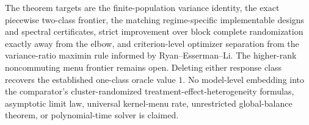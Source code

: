 The theorem targets are the finite-population variance identity, the exact piecewise two-class frontier, the matching regime-specific implementable designs and spectral certificates, strict improvement over block complete randomization exactly away from the elbow, and criterion-level optimizer separation from the variance-ratio maximin rule informed by Ryan--Esserman--Li. The higher-rank noncommuting menu frontier remains open. Deleting either response class recovers the established one-class oracle value \(1\). No model-level embedding into the comparator's cluster-randomized treatment-effect-heterogeneity formulas, asymptotic limit law, universal kernel-menu rate, unrestricted global-balance theorem, or polynomial-time solver is claimed.